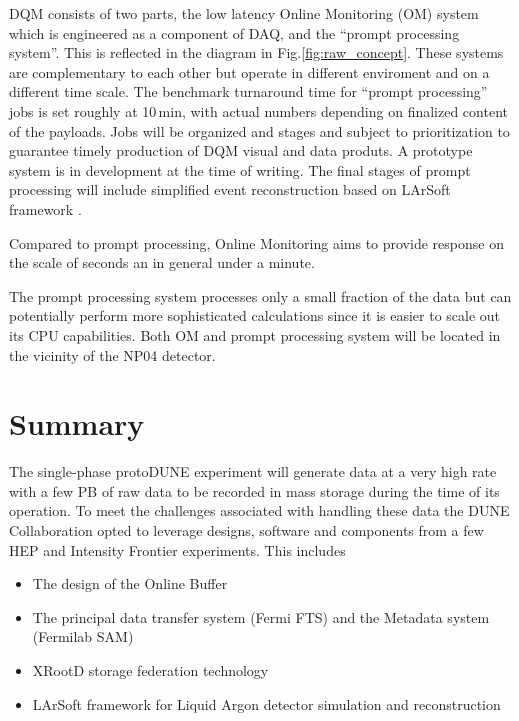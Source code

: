 \documentclass[a4paper]{jpconf}
\newcommand{\pd}{protoDUNE\xspace}
\begin{document}
DQM consists of two parts,  the low latency Online Monitoring (OM)
system which is engineered as a component of DAQ, and
the ``prompt processing system''. This is reflected in the diagram
in Fig.\ref{fig:raw_concept}.
These systems are complementary to each other but operate
in different enviroment and on a different time scale.
The benchmark turnaround time for ``prompt processing'' jobs 
is set roughly at 10\,min, with actual numbers depending on
finalized content of the payloads. Jobs will be organized and stages
and subject to prioritization to guarantee timely production of DQM
visual and data produts. A prototype system is in development at
the time of writing. The final stages of prompt processing will
include simplified event reconstruction based on LArSoft framework
\cite{larsoft}.

Compared to prompt processing, Online Monitoring aims
to provide response on the scale of seconds an in general under a minute.

The prompt processing system processes only a small fraction of the data
but can potentially perform more sophisticated calculations since it is
easier to scale out its CPU capabilities. Both OM and prompt processing system
will be located in the vicinity of the NP04 detector.

\section{Summary}
The single-phase \pd experiment will generate data at a very high rate
with a few PB of raw data to be recorded in mass storage during the time of
its operation. To meet the challenges associated with handling these
data the DUNE Collaboration opted to leverage designs, software and
components from a few HEP and Intensity Frontier experiments. This includes
\begin{itemize}
\item The design of the Online Buffer
\item The principal data transfer system (Fermi FTS) and the Metadata system (Fermilab SAM)
\item XRootD storage federation technology
\item LArSoft framework for Liquid Argon detector simulation and reconstruction
\end{itemize}
\end{document}
